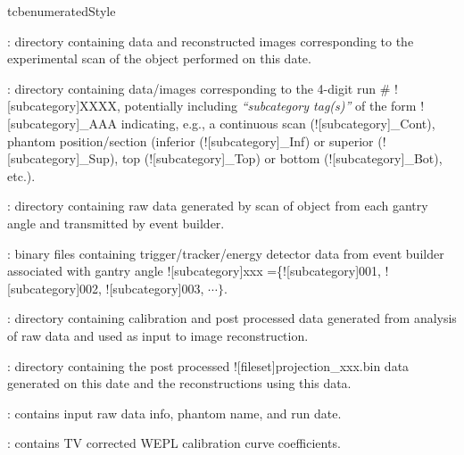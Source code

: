 \begin{tcbenvironment}
\begin{tcbparbox}{tcbenumeratedStyle}
\begin{ThinEnum}
\begin{ThinEnum}
\begin{ThinEnum}
                \item {} : directory containing data and reconstructed images corresponding to the experimental scan of the object performed on this date.
                \begin{ThinEnum}
                    \item {} : directory containing data/images corresponding to the 4-digit run \# \docentry![subcategory]{XXXX}, potentially including \emph{``subcategory tag(s)''} of the form \docentry![subcategory]{\_AAA} indicating, e.g., a continuous scan (\docentry![subcategory]{\_Cont}), phantom position/section (inferior (\docentry![subcategory]{\_Inf}) or superior (\docentry![subcategory]{\_Sup}), top (\docentry![subcategory]{\_Top}) or bottom (\docentry![subcategory]{\_Bot}), etc.).
                    \begin{ThinEnum}
                        \item {} : directory containing raw data generated by scan of object from each gantry angle and transmitted by event builder.
                        \begin{ThinEnum}
                            \item {} : binary files containing trigger/tracker/energy detector data from event builder associated with gantry angle \docentry![subcategory]{xxx} =\{\docentry![subcategory]{001}, \docentry![subcategory]{002}, \docentry![subcategory]{003}, $\cdots\}$.
                        \end{ThinEnum}
                        \item {} : directory containing calibration and post processed data generated from analysis of raw data and used as input to image reconstruction.
                        \begin{ThinEnum}
                            \item {} : directory containing the post processed \docentry![fileset]{projection\_xxx.bin} data generated on this date and the reconstructions using this data.
                            \begin{ThinEnum}
                                \item {} : contains input raw data info, phantom name, and run date.
                                \item {} : contains TV corrected WEPL calibration curve coefficients.

\end{ThinEnum}
\end{ThinEnum}
\end{ThinEnum}
\end{ThinEnum}
\end{ThinEnum}
\end{ThinEnum}
\end{ThinEnum}
\end{tcbparbox}
\end{tcbenvironment}
